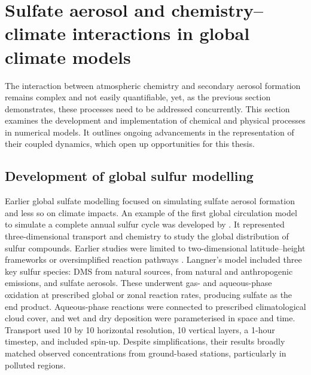 \section{Sulfate aerosol and chemistry–climate interactions in global climate models} %
\label{ch1:sec:sulfate-aer-in-models}

The interaction between atmospheric chemistry and secondary aerosol formation remains complex and not easily quantifiable, yet, as the previous section demonstrates, these processes need to be addressed concurrently. This section examines the development and implementation of chemical and physical processes in numerical models. It outlines ongoing advancements in the representation of their coupled dynamics, which open up opportunities for this thesis.

\subsection{Development of global sulfur modelling}

Earlier global sulfate modelling focused on simulating sulfate aerosol formation and less so on climate impacts. An example of the first global circulation model to simulate a complete annual sulfur cycle was developed by \citet{langnerGlobalThreedimensionalModel1991}. It represented three-dimensional transport and chemistry to study the global distribution of sulfur compounds. Earlier studies were limited to two-dimensional latitude–height frameworks \citep{rodheGlobalDistributionSulfur1980} or oversimplified reaction pathways \citep{ericksoniiiGlobalOceantoatmosphereDimethyl1990}. Langner's model included three key sulfur species: DMS from natural sources,  from natural and anthropogenic emissions, and sulfate aerosols. These underwent gas- and aqueous-phase oxidation at prescribed global or zonal reaction rates, producing sulfate as the end product. Aqueous-phase reactions were connected to prescribed climatological cloud cover, and wet and dry deposition were parameterised in space and time. Transport used 10\textdegree{} by 10\textdegree{} horizontal resolution, 10 vertical layers, a 1-hour timestep, and included spin-up. Despite simplifications, their results broadly matched observed concentrations from ground-based stations, particularly in polluted regions.

